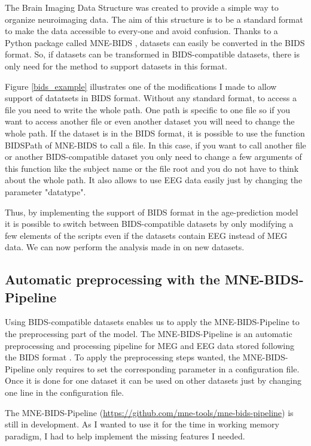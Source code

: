 The Brain Imaging Data Structure was created to provide a simple way to organize neuroimaging data. The aim of this structure is to be a standard format to make the data accessible to every-one and avoid confusion. Thanks to a Python package called MNE-BIDS \cite{appelhoff2019mne}, datasets can easily be converted in the BIDS format. So, if datasets can be transformed in BIDS-compatible datasets, there is only need for the method to support datasets in this format.

Figure \ref{bids_example} illustrates one of the modifications I made to allow support of datatsets in BIDS format. Without any standard format, to access a file you need to write the whole path. One path is specific to one file so if you want to access another file or even another dataset you will need to change the whole path. If the dataset is in the BIDS format, it is possible to use the function BIDSPath of MNE-BIDS to call a file. In this case, if you want to call another file or another BIDS-compatible dataset you only need to change a few arguments of this function like the subject name or the file root and you do not have to think about the whole path. It also allows to use EEG data easily just by changing the parameter "datatype".

Thus, by implementing the support of BIDS format in the age-prediction model it is possible to switch between BIDS-compatible datasets by only modifying a few elements of the scripts even
if the datasets contain EEG instead of MEG data. We can now perform the analysis made in
\cite{herbst2021abstracting} on new datasets.


\subsection{Automatic preprocessing with the MNE-BIDS-Pipeline}

Using BIDS-compatible datasets enables us to apply the MNE-BIDS-Pipeline to the preprocessing part of the model. The MNE-BIDS-Pipeline is an automatic preprocessing and processing pipeline for MEG and EEG data stored following the BIDS format \cite{gorgolewski2016brain}. To apply the preprocessing steps wanted, the MNE-BIDS-Pipeline only requires to set the corresponding parameter in a configuration file. Once it is done for one dataset it can be used on other datasets just by changing one line in the configuration file.

The MNE-BIDS-Pipeline (\url{https://github.com/mne-tools/mne-bids-pipeline}) is still in development. As I wanted to use it for the time in working memory paradigm, I had to help implement the missing features I needed.

